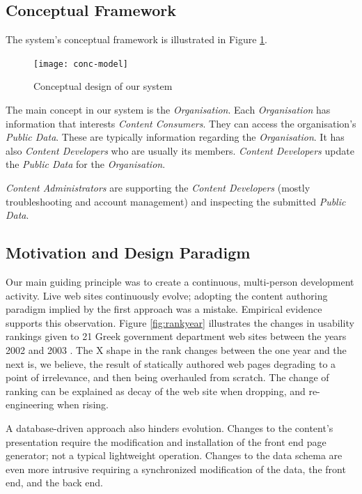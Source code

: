 \documentclass[10pt]{article}
\begin{document}
\subsection{Conceptual Framework}

The system's conceptual framework is illustrated in Figure \ref{fig:conc-model}.

\begin{figure}[h!]
\begin{center}
\texttt{[image: conc-model]}
\end{center}
\caption{Conceptual design of our system}
\label{fig:conc-model}
\end{figure}

The main concept in our system is the \textit{Organisation}. Each \textit{Organisation} has 
information that interests \textit{Content Consumers}. They 
can access the organisation's \textit{Public Data}.
These are typically information regarding the \textit{Organisation}.
It has also \textit{Content Developers} 
who are usually its members. \textit{Content Developers} update the 
\textit{Public Data} for the \textit{Organisation}.

\textit{Content Administrators} are supporting the \textit{Content Developers} 
(mostly troubleshooting and account management)
and inspecting the submitted \textit{Public Data}.

\subsection{Motivation and Design Paradigm}

Our main guiding principle was to create a continuous, multi-person 
development activity.
Live web sites continuously evolve;
adopting the content authoring paradigm implied
by the first approach was a mistake.
Empirical evidence supports this observation.
Figure \ref{fig:rankyear} illustrates the changes
in usability rankings given to 21 Greek government department
web sites between the years 2002 and 2003 \cite{G03}.
The X shape in the rank changes between the one year and the next
is, we believe, the result of statically authored web pages
degrading to a point of irrelevance, and then being overhauled
from scratch. The change of ranking can be explained as decay of the web site when dropping,
and re-engineering when rising.

A database-driven approach also hinders evolution.
Changes to the content's presentation require the modification
and installation of the front end page generator;
not a typical lightweight operation.
Changes to the data schema are even more intrusive
requiring a synchronized modification of the data,
the front end, and the back end.
\end{document}
